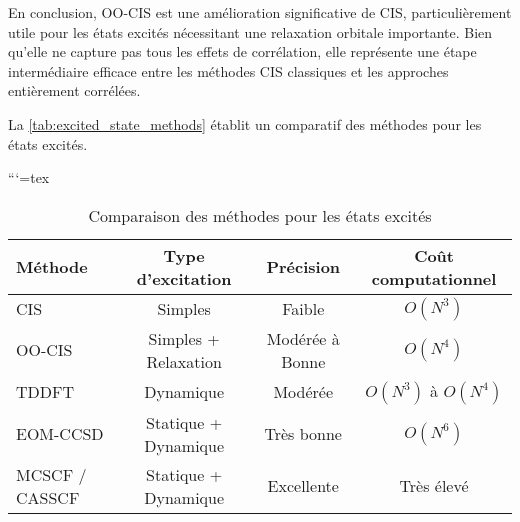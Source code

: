 \documentclass[12pt,a4paper]{report}
\numberwithin{equation}{section}
\numberwithin{figure}{section}
\numberwithin{table}{section}
\begin{document}
\begin{markdown}
En conclusion, OO-CIS est une amélioration significative de CIS, particulièrement utile pour les états excités nécessitant une relaxation orbitale importante. Bien qu'elle ne capture pas tous les effets de corrélation, elle représente une étape intermédiaire efficace entre les méthodes CIS classiques et les approches entièrement corrélées. 

La \autoref{tab:excited_state_methods} établit un comparatif des méthodes pour les états excités.

```{=tex}
\begin{table}[htpb]
\centering
\caption{Comparaison des méthodes pour les états excités}
\begin{tabular}{@{}lccc@{}}
\toprule
\textbf{Méthode}         & \textbf{Type d’excitation}   & \textbf{Précision}   & \textbf{Coût computationnel} \\ \midrule
CIS                      & Simples                     & Faible               & $O(N^3)$                     \\
OO-CIS                   & Simples + Relaxation        & Modérée à Bonne      & $O(N^4)$                     \\
TDDFT                    & Dynamique                   & Modérée              & $O(N^3)$ à $O(N^4)$          \\
EOM-CCSD                 & Statique + Dynamique        & Très bonne           & $O(N^6)$                     \\
MCSCF / CASSCF           & Statique + Dynamique        & Excellente           & Très élevé                    \\ \bottomrule
\end{tabular}
\label{tab:excited_state_methods}
\end{table}




\end{markdown}
\end{document}
